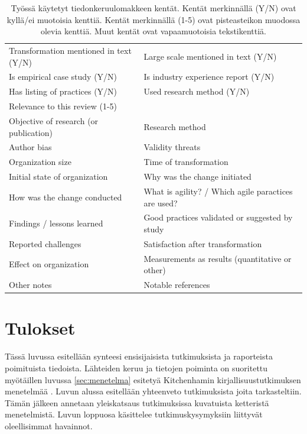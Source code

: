 \begin{table}[h]
    \begin{tabular}{| l | p{7.64cm} |}
        \hline
        Transformation mentioned in text (Y/N) &
        Large scale mentioned in text (Y/N) \\
        Is empirical case study (Y/N) &
        Is industry experience report (Y/N) \\
        Has listing of practices (Y/N) &
        Used research method (Y/N) \\
        Relevance to this review (1-5) & \\
        Objective of research (or publication) &
        Research method \\
        Author bias &
        Validity threats \\
        Organization size &
        Time of transformation \\
        Initial state of organization &
        Why was the change initiated \\
        How was the change conducted &
        What is agility? / Which agile paractices are used? \\
        Findings / lessons learned &
        Good practices validated or suggested by study \\
        Reported challenges &
        Satisfaction after transformation \\
        Effect on organization &
        Measurements as results (quantitative or other) \\
        Other notes &
        Notable references \\
        \hline
    \end{tabular}
    \caption{Työssä käytetyt tiedonkeruulomakkeen kentät. Kentät merkinnällä
    (Y/N) ovat kyllä/ei muotoisia kenttiä. Kentät merkinnällä (1-5) ovat
    pisteasteikon muodossa olevia kenttiä. Muut kentät ovat vapaamuotoisia
    tekstikenttiä.}
    \label{table:dataform}
\end{table}



\section{Tulokset}
\label{sec:tulokset}

Tässä luvussa esitellään synteesi ensisijaisista tutkimuksista ja raporteista
poimituista tiedoista. Lähteiden keruu ja tietojen poiminta on suoritettu
myötäillen luvussa \ref{sec:menetelma} esitetyä Kitchenhamin
kirjallisuustutkimuksen menetelmää . Luvun alussa
esitellään yhteenveto tutkimuksista joita tarkasteltiin. Tämän jälkeen annetaan
yleiskatsaus tutkimuksissa kuvatuista ketteristä menetelmistä. Luvun loppuosa
käsittelee tutkimuskysymyksiin liittyvät oleellisimmat havainnot.

